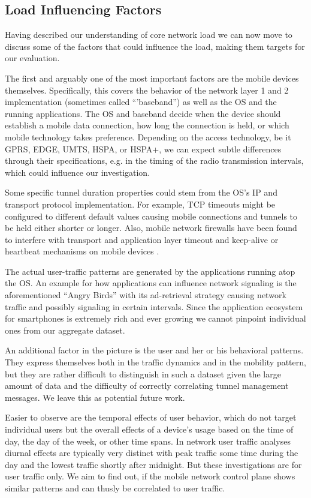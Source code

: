 \subsection{Load Influencing Factors}

Having described our understanding of core network load we can now move to discuss some of the factors that could influence the load, making them targets for our evaluation.

The first and arguably one of the most important factors are the mobile devices themselves. Specifically, this covers the behavior of the network layer 1 and 2 implementation (sometimes called ``'baseband'') as well as the \ac{OS} and the running applications. The OS and baseband decide when the device should establish a mobile data connection, how long the connection is held, or which mobile technology takes preference. Depending on the access technology, be it \acs{GPRS}, \acs{EDGE}, \acs{UMTS}, \acs{HSPA}, or \acs{HSPA+}, we can expect subtle differences through their specifications, e.g. in the timing of the radio transmission intervals, which could influence our investigation. 

Some specific tunnel duration properties could stem from the \ac{OS}'s IP and transport protocol implementation. For example, TCP timeouts might be configured to different default values causing mobile connections and tunnels to be held either shorter or longer. Also, mobile network firewalls have been found to interfere with transport and application layer timeout and keep-alive or heartbeat mechanisms on mobile devices \cite{sigcomm11middleboxes}.

The actual user-traffic patterns are generated by the applications running atop the OS. An example for how applications can influence network signaling is the aforementioned ``Angry Birds'' with its ad-retrieval strategy causing network traffic and possibly signaling in certain intervals. Since the application ecosystem for smartphones is extremely rich and ever growing we cannot pinpoint individual ones from our aggregate dataset.

An additional factor in the picture is the user and her or his behavioral patterns. They express themselves both in the traffic dynamics and in the mobility pattern, but they are rather difficult to distinguish in such a dataset given the large amount of data and the difficulty of correctly correlating tunnel management messages. We leave this as potential future work.

Easier to observe are the temporal effects of user behavior, which do not target individual users but the overall effects of a device's usage based on the time of day, the day of the week, or other time spans. In network user traffic analyses diurnal effects are typically very distinct with peak traffic some time during the day and the lowest traffic shortly after midnight. But these investigations are for user traffic only. We aim to find out, if the mobile network control plane shows similar patterns and can thusly be correlated to user traffic.

